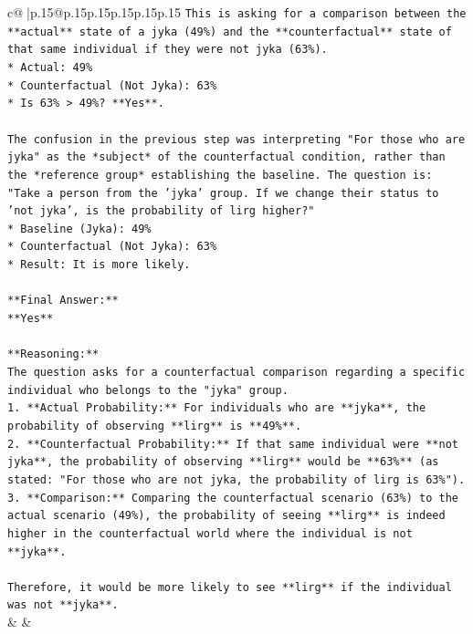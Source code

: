 \documentclass{article}
\begin{document}
{\begin{supertabular}{c@{$\;$}|p{.15\linewidth}@{}p{.15\linewidth}p{.15\linewidth}p{.15\linewidth}p{.15\linewidth}p{.15\linewidth}}
{{{\texttt{This is asking for a comparison between the **actual** state of a jyka (49\%) and the **counterfactual** state of that same individual if they were not jyka (63\%).} \\
\texttt{*   Actual: 49\%} \\
\texttt{*   Counterfactual (Not Jyka): 63\%} \\
\texttt{*   Is 63\% > 49\%? **Yes**.} \\
\\ 
\texttt{The confusion in the previous step was interpreting "For those who are jyka" as the *subject* of the counterfactual condition, rather than the *reference group* establishing the baseline. The question is: "Take a person from the 'jyka' group. If we change their status to 'not jyka', is the probability of lirg higher?"} \\
\texttt{*   Baseline (Jyka): 49\%} \\
\texttt{*   Counterfactual (Not Jyka): 63\%} \\
\texttt{*   Result: It is more likely.} \\
\\ 
\texttt{**Final Answer:**} \\
\texttt{**Yes**} \\
\\ 
\texttt{**Reasoning:**} \\
\texttt{The question asks for a counterfactual comparison regarding a specific individual who belongs to the "jyka" group.} \\
\texttt{1.  **Actual Probability:** For individuals who are **jyka**, the probability of observing **lirg** is **49\%**.} \\
\texttt{2.  **Counterfactual Probability:** If that same individual were **not jyka**, the probability of observing **lirg** would be **63\%** (as stated: "For those who are not jyka, the probability of lirg is 63\%").} \\
\texttt{3.  **Comparison:** Comparing the counterfactual scenario (63\%) to the actual scenario (49\%), the probability of seeing **lirg** is indeed higher in the counterfactual world where the individual is not **jyka**.} \\
\\ 
\texttt{Therefore, it would be more likely to see **lirg** if the individual was not **jyka**.} \\
            }
        }
    }
    & & \\ \\


\end{supertabular}}
\end{document}
